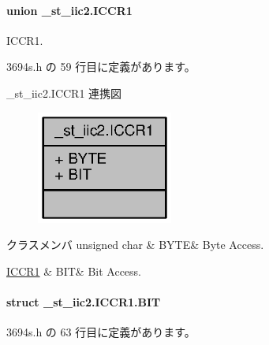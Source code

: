 \paragraph{union \+\_\+st\+\_\+iic2.\+I\+C\+C\+R1}
I\+C\+C\+R1. 

 3694s.\+h の 59 行目に定義があります。



\+\_\+st\+\_\+iic2.\+I\+C\+C\+R1 連携図
\nopagebreak
\begin{figure}[H]
\begin{center}
\leavevmode
\includegraphics[width=127pt]{de/d72/union__st__iic2_8ICCR1__coll__graph}
\end{center}
\end{figure}
\begin{DoxyFields}{クラスメンバ}
unsigned char\label{3694s_8h_ae409eb2ba6eb6801f52763ae370c350e}
&
B\+Y\+T\+E&
Byte Access. \\
\hline

\hyperlink{3694s_8h_d8/dba/struct__st__iic2_8ICCR1_8BIT}{I\+C\+C\+R1}\label{3694s_8h_adb957fdc8000e1eef04a243f5199aa52}
&
B\+I\+T&
Bit Access. \\
\hline

\end{DoxyFields}
\label{struct__st__iic2_8ICCR1_8BIT}
\paragraph{struct \+\_\+st\+\_\+iic2.\+I\+C\+C\+R1.\+B\+I\+T}


 3694s.\+h の 63 行目に定義があります。



